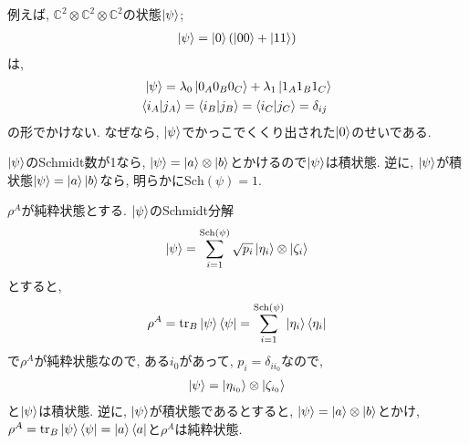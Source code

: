 \begin{ex}
    \label{ex2.77}
    例えば, $\mathbb{C}^2 \otimes \mathbb{C}^2 \otimes \mathbb{C}^2$の状態$\ket{\psi}$;
    \begin{align*}
        \ket{\psi}= \ket{0} \left( {\ket{00} + \ket{11}}\right)
    \end{align*}
    は,
    \begin{align*}
        \ket{\psi}
        =
        \lambda_0 \ket{0_{A}{0_{B}}{0_{C}}}
        +
        \lambda_1 \ket{1_{A}{1_{B}}{1_{C}} } \\
        \braket{i_{A} | j_{A}} = \braket{i_{B} | j_{B}} = \braket{i_{C} | j_{C}} = \delta_{ij} \
    \end{align*}
    の形でかけない. なぜなら, $\ket{\psi}$でかっこでくくり出された$\ket{0}$のせいである.
\end{ex}

\begin{ex}
    \label{ex2.78}
    $\ket{\psi}$のSchmidt数が1なら, $\ket{\psi} = \ket{a} \otimes \ket{b}$とかけるので$\ket{\psi}$は積状態.
    逆に, $\ket{\psi}$が積状態$\ket{ \psi } = \ket{a} \ket{b}$なら, 明らかに$\mathrm{Sch}(\psi) = 1$.
    \par
    $\rho^A$が純粋状態とする. $\ket{\psi}$のSchmidt分解
    \begin{align*}
        \ket{\psi} = \sum_{i = 1}^{\mathrm{Sch}(\psi)} \sqrt{p_i} \ket{\eta_i} \otimes \ket{\zeta_i}
    \end{align*} 
    とすると, 
    \begin{align*}
        \rho^A 
        = \mathrm{tr}_{B} \ket{\psi}\bra{\psi} 
        =  \sum_{i = 1}^{\mathrm{Sch}(\psi)} \ket{\eta_i}\bra{\eta_i}
    \end{align*}
    で$\rho^A$が純粋状態なので, ある$i_0$があって, $p_i = \delta_{i i_0}$なので, 
    \begin{align*}
        \ket{\psi} = \ket{\eta_{i_0}} \otimes \ket{\zeta_{i_0}}
    \end{align*}
    と$\ket{\psi}$は積状態. 逆に, $\ket{\psi}$が積状態であるとすると, $\ket{\psi}= \ket{a} \otimes \ket{b}$とかけ, $\rho^A = \mathrm{tr}_{B} \ket{\psi}\bra{\psi}= \ket{a} \bra{a}$と$\rho^A$は純粋状態.
\end{ex}

